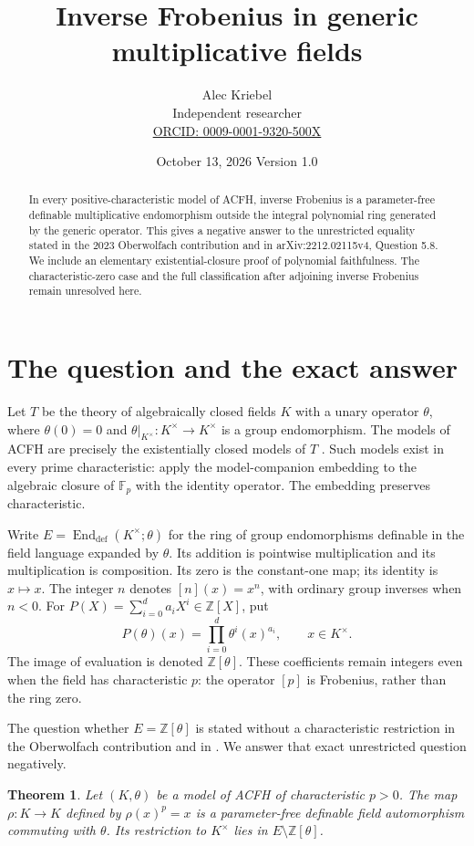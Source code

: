 \documentclass[11pt,a4paper]{article}
\title{Inverse Frobenius in generic multiplicative fields}
\author{Alec Kriebel\\Independent researcher\\
 \small\href{https://orcid.org/0009-0001-9320-500X}{ORCID: 0009-0001-9320-500X}}
\date{October 13, 2026 \quad Version 1.0}
\newtheorem{theorem}{Theorem}
\newcommand{\Z}{\mathbb Z}
\newcommand{\End}{\operatorname{End}_{\mathrm{def}}}
\begin{document}
\maketitle
\begin{abstract}
In every positive-characteristic model of ACFH, inverse Frobenius is a
parameter-free definable multiplicative endomorphism outside the integral
polynomial ring generated by the generic operator. This gives a negative
answer to the unrestricted equality stated in the 2023 Oberwolfach
contribution and in arXiv:2212.02115v4, Question 5.8.
We include an elementary existential-closure proof of polynomial
faithfulness. The characteristic-zero case and the full classification
after adjoining inverse Frobenius remain unresolved here.
\end{abstract}

\section{The question and the exact answer}
Let $T$ be the theory of algebraically closed fields $K$ with a unary
operator $\theta$, where $\theta(0)=0$ and
$\theta|_{K^\times}:K^\times\to K^\times$ is a group endomorphism.
The models of ACFH are precisely the existentially closed models of $T$
\cite[Corollary 3.15]{de25}. Such models exist in every prime
characteristic: apply the model-companion embedding
\cite[Corollary 3.16]{de25} to the algebraic closure of $\mathbb F_p$
with the identity operator. The embedding preserves characteristic.

Write $E=\End(K^\times;\theta)$ for the ring of group endomorphisms
definable in the field language expanded by $\theta$.
Its addition is pointwise multiplication and its multiplication is
composition. Its zero is the constant-one map; its identity is $x\mapsto x$.
The integer $n$ denotes $[n](x)=x^n$, with ordinary group inverses when
$n<0$. For $P(X)=\sum_{i=0}^d a_iX^i\in\Z[X]$, put
\[
 P(\theta)(x)=\prod_{i=0}^d\theta^i(x)^{a_i},\qquad x\in K^\times.
\]
The image of evaluation is denoted $\Z[\theta]$.
These coefficients remain integers even when the field has characteristic
$p$: the operator $[p]$ is Frobenius, rather than the ring zero.

The question whether $E=\Z[\theta]$ is stated without a characteristic
restriction in the Oberwolfach contribution \cite[pp.~97--98]{ow23}
and in \cite[Question 5.8]{de25}. We answer that exact unrestricted
question negatively.

\begin{theorem}\label{thm:main}
Let $(K,\theta)$ be a model of ACFH of characteristic $p>0$.
The map $\rho:K\to K$ defined by $\rho(x)^p=x$ is a parameter-free
definable field automorphism commuting with $\theta$.
Its restriction to $K^\times$ lies in $E\setminus\Z[\theta]$.
\end{theorem}
\end{document}
